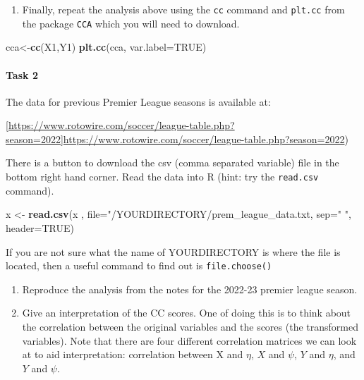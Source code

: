 \documentclass[
]{book}
\newenvironment{Shaded}{\begin{snugshade}}{\end{snugshade}}
\newcommand{\AttributeTok}[1]{\textcolor[rgb]{0.13,0.29,0.53}{#1}}
\newcommand{\ConstantTok}[1]{\textcolor[rgb]{0.56,0.35,0.01}{#1}}
\newcommand{\FunctionTok}[1]{\textcolor[rgb]{0.13,0.29,0.53}{\textbf{#1}}}
\newcommand{\NormalTok}[1]{#1}
\newcommand{\OtherTok}[1]{\textcolor[rgb]{0.56,0.35,0.01}{#1}}
\newcommand{\StringTok}[1]{\textcolor[rgb]{0.31,0.60,0.02}{#1}}
\providecommand{\tightlist}{%
  \setlength{\itemsep}{0pt}\setlength{\parskip}{0pt}}
\theoremstyle{definition}
\theoremstyle{definition}
\theoremstyle{definition}
\theoremstyle{definition}
\theoremstyle{remark}
\begin{document}
\begin{enumerate}
\def\labelenumi{\roman{enumi}.}
\setcounter{enumi}{5}
\tightlist
\item
  Finally, repeat the analysis above using the \texttt{cc} command and \texttt{plt.cc} from the package \texttt{CCA} which you will need to download.
\end{enumerate}

\begin{Shaded}
\begin{Highlighting}[]
\NormalTok{cca}\OtherTok{\textless{}{-}}\FunctionTok{cc}\NormalTok{(X1,Y1)}
\FunctionTok{plt.cc}\NormalTok{(cca, }\AttributeTok{var.label=}\ConstantTok{TRUE}\NormalTok{)}
\end{Highlighting}
\end{Shaded}

\paragraph*{Task 2}\label{task-2}

The data for previous Premier League seasons is available at:

{[}\url{https://www.rotowire.com/soccer/league-table.php?season=2022}{]}\url{https://www.rotowire.com/soccer/league-table.php?season=2022})

There is a button to download the csv (comma separated variable) file in the bottom right hand corner. Read the data into R (hint: try the \texttt{read.csv} command).

\begin{Shaded}
\begin{Highlighting}[]
\NormalTok{x }\OtherTok{\textless{}{-}} \FunctionTok{read.csv}\NormalTok{(x , }\AttributeTok{file=}\StringTok{"/YOURDIRECTORY/prem\_league\_data.txt, }
\StringTok{sep="} \StringTok{", header=TRUE)}
\end{Highlighting}
\end{Shaded}

If you are not sure what the name of YOURDIRECTORY is where the file is located, then a useful command to find out is \texttt{file.choose()}

\begin{enumerate}
\def\labelenumi{\roman{enumi}.}
\item
  Reproduce the analysis from the notes for the 2022-23 premier league season.
\item
  Give an interpretation of the CC scores. One of doing this is to think about the correlation between the original variables and the scores (the transformed variables). Note that there are four different correlation matrices we can look at to aid interpretation: correlation between X and \(\eta\), \(X\) and \(\psi\), \(Y\) and \(\eta\), and \(Y\) and \(\psi\).
\end{enumerate}
\end{document}
